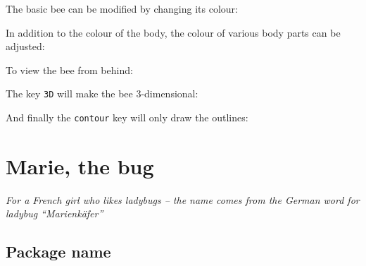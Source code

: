 \documentclass[parskip=half]{scrartcl}
\begin{document}
The basic bee can be modified by changing its colour:
\begin{tcblisting}{}
\bee[body=blue]
\end{tcblisting}

In addition to the colour of the body, the colour of various body parts can be adjusted:
\begin{tcblisting}{}
\bee[antennas=red]
\end{tcblisting}
\begin{tcblisting}{}
\bee[eye=red]
\end{tcblisting}
\begin{tcblisting}{}
\bee[mouth=red]
\end{tcblisting}
\begin{tcblisting}{}
\bee[wings=red]
\end{tcblisting}
\begin{tcblisting}{}
\bee[hands=red]
\end{tcblisting}
\begin{tcblisting}{}
\bee[stripes=red]
\end{tcblisting}

To view the bee from behind:
\begin{tcblisting}{}
\bee[back]
\end{tcblisting}

The key \lstinline|3D| will make the bee 3-dimensional:
\begin{tcblisting}{}
\bee[3D]
\end{tcblisting}

And finally the \lstinline|contour| key will only draw the outlines:
\begin{tcblisting}{}
\bee[contour=black]
\end{tcblisting}

%
%
\clearpage
\section[Bug]{Marie, the bug}

\emph{For a French girl who likes ladybugs -- the name comes from the German word for ladybug ``Marienkäfer''}

\subsection{Package name}
\end{document}
